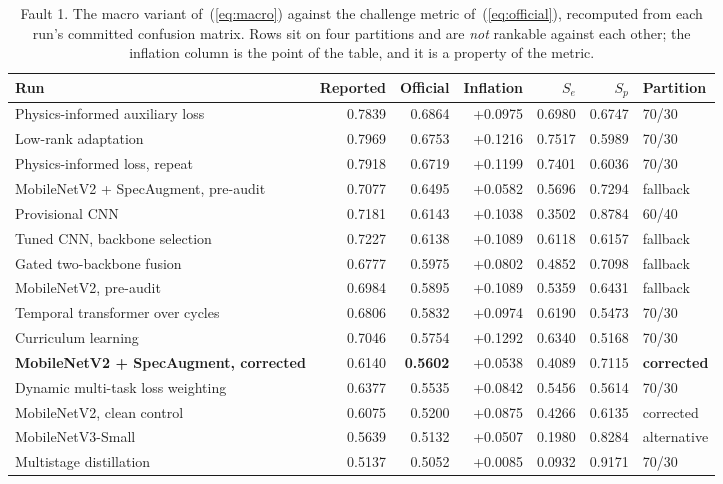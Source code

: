 \documentclass[journal,onecolumn]{IEEEtran}
\newcommand{\best}[1]{\textbf{#1}}
\begin{document}
\begin{table}[!t]
\centering
\caption{Fault 1. The macro variant of~(\ref{eq:macro}) against the challenge metric
of~(\ref{eq:official}), recomputed from each run's committed confusion matrix. Rows sit on
four partitions and are \emph{not} rankable against each other; the inflation column is the
point of the table, and it is a property of the metric.}
\label{tab:metricaudit}
\footnotesize
\begin{tabular}{lrrrrrl}
\toprule
Run & Reported & \best{Official} & Inflation & $S_e$ & $S_p$ & Partition \\
\midrule
Physics-informed auxiliary loss      & 0.7839 & 0.6864 & +0.0975 & 0.6980 & 0.6747 & 70/30 \\
Low-rank adaptation                  & 0.7969 & 0.6753 & +0.1216 & 0.7517 & 0.5989 & 70/30 \\
Physics-informed loss, repeat        & 0.7918 & 0.6719 & +0.1199 & 0.7401 & 0.6036 & 70/30 \\
MobileNetV2 + SpecAugment, pre-audit & 0.7077 & 0.6495 & +0.0582 & 0.5696 & 0.7294 & fallback \\
Provisional CNN                      & 0.7181 & 0.6143 & +0.1038 & 0.3502 & 0.8784 & 60/40 \\
Tuned CNN, backbone selection        & 0.7227 & 0.6138 & +0.1089 & 0.6118 & 0.6157 & fallback \\
Gated two-backbone fusion            & 0.6777 & 0.5975 & +0.0802 & 0.4852 & 0.7098 & fallback \\
MobileNetV2, pre-audit               & 0.6984 & 0.5895 & +0.1089 & 0.5359 & 0.6431 & fallback \\
Temporal transformer over cycles     & 0.6806 & 0.5832 & +0.0974 & 0.6190 & 0.5473 & 70/30 \\
Curriculum learning                  & 0.7046 & 0.5754 & +0.1292 & 0.6340 & 0.5168 & 70/30 \\
\best{MobileNetV2 + SpecAugment, corrected} & 0.6140 & \best{0.5602} & +0.0538 & 0.4089 & 0.7115 & \best{corrected} \\
Dynamic multi-task loss weighting    & 0.6377 & 0.5535 & +0.0842 & 0.5456 & 0.5614 & 70/30 \\
MobileNetV2, clean control           & 0.6075 & 0.5200 & +0.0875 & 0.4266 & 0.6135 & corrected \\
MobileNetV3-Small                    & 0.5639 & 0.5132 & +0.0507 & 0.1980 & 0.8284 & alternative \\
Multistage distillation              & 0.5137 & 0.5052 & +0.0085 & 0.0932 & 0.9171 & 70/30 \\

\end{tabular}
\end{table}
\end{document}
